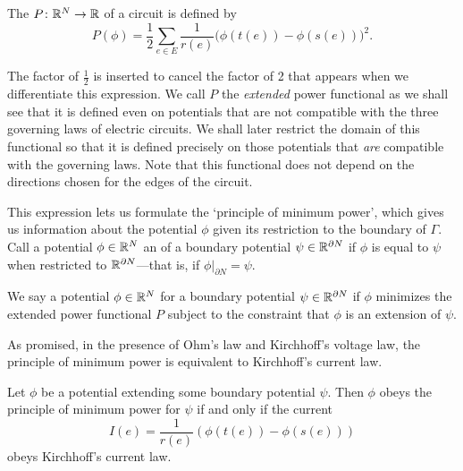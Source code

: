 \begin{definition}
The  $P{\colon} {\mathbb{R}}^N \to {\mathbb{R}}$ of a circuit is
defined by
\[
P(\phi) =\frac{1}{2} \sum_{e \in E} \frac{1}{r(e)}\big(\phi(t(e))-\phi(s(e))\big)^2.
\]
\end{definition}

\noindent
The factor of $\frac{1}{2}$ is inserted to cancel the factor of 2 that appears when
we differentiate this expression.  We call $P$ the \emph{extended} power functional as we shall see that it is defined even on potentials that are not compatible with the three governing laws of electric circuits. We shall later restrict the domain of this functional so that it is defined precisely on those potentials that \emph{are} compatible with the
governing laws. Note that this functional does not depend on the directions
chosen for the edges of the circuit.

This expression lets us formulate the `principle of minimum power', which gives
us information about the potential $\phi$ given its restriction to the boundary
of $\Gamma$. Call a potential $\phi \in {\mathbb{R}}^N$ an  of a
boundary potential $\psi \in {\mathbb{R}}^{\partial N}$ if $\phi$ is equal to $\psi$ when
restricted to ${\mathbb{R}}^{\partial N}$---that is, if $\phi|_{\partial N} = \psi$. 

\begin{definition}
We say a potential $\phi \in {\mathbb{R}}^{N}$  for a boundary potential $\psi \in {\mathbb{R}}^{\partial N}$ if $\phi$ minimizes
the extended power functional $P$ subject to the constraint that  $\phi$ is an
extension of $\psi$. 
\end{definition}

As promised, in the presence of Ohm's law and Kirchhoff's voltage law, the
principle of minimum power is equivalent to Kirchhoff's current law.

\begin{proposition} \label{minimum_power_implies_kirchhoff_current}
Let $\phi$ be a potential extending some boundary potential $\psi$. Then $\phi$
obeys the principle of minimum power for $\psi$ if and only if the 
current 
\[  I(e) = \frac1{r(e)}(\phi(t(e))-\phi(s(e))) \] 
obeys Kirchhoff's current law.
\end{proposition}

